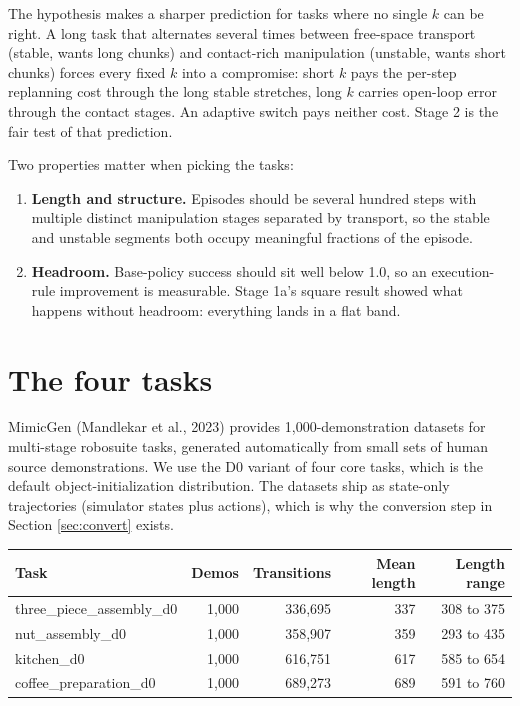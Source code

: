 \documentclass[11pt]{article}
\begin{document}
The hypothesis makes a sharper prediction for tasks where no single $k$ can be
right. A long task that alternates several times between free-space transport
(stable, wants long chunks) and contact-rich manipulation (unstable, wants
short chunks) forces every fixed $k$ into a compromise: short $k$ pays the
per-step replanning cost through the long stable stretches, long $k$ carries
open-loop error through the contact stages. An adaptive switch pays neither
cost. Stage 2 is the fair test of that prediction.

Two properties matter when picking the tasks:

\begin{enumerate}[leftmargin=2em]
  \item \textbf{Length and structure.} Episodes should be several hundred steps
        with multiple distinct manipulation stages separated by transport, so
        the stable and unstable segments both occupy meaningful fractions of
        the episode.
  \item \textbf{Headroom.} Base-policy success should sit well below 1.0, so an
        execution-rule improvement is measurable. Stage 1a's square result
        showed what happens without headroom: everything lands in a flat band.
\end{enumerate}

\section{The four tasks}
\label{sec:tasks}

MimicGen (Mandlekar et al., 2023) provides 1{,}000-demonstration datasets for
multi-stage robosuite tasks, generated automatically from small sets of human
source demonstrations. We use the D0 variant of four core tasks, which is the
default object-initialization distribution. The datasets ship as state-only
trajectories (simulator states plus actions), which is why the conversion step
in Section \ref{sec:convert} exists.

\begin{center}
\small
\begin{tabular}{@{}lrrrr@{}}
\toprule
Task & Demos & Transitions & Mean length & Length range \\
\midrule
three\_piece\_assembly\_d0 & 1{,}000 & 336{,}695 & 337 & 308 to 375 \\
nut\_assembly\_d0          & 1{,}000 & 358{,}907 & 359 & 293 to 435 \\
kitchen\_d0                & 1{,}000 & 616{,}751 & 617 & 585 to 654 \\
coffee\_preparation\_d0    & 1{,}000 & 689{,}273 & 689 & 591 to 760 \\
\bottomrule
\end{tabular}
\end{center}
\end{document}
